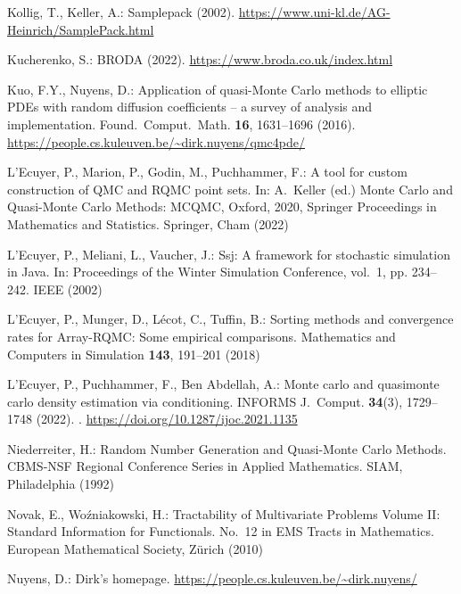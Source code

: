 \documentclass[graybox]{svmult}
\begin{document}
\begin{thebibliography}{10}
	Kollig, T., Keller, A.: Samplepack (2002).
	\newblock \urlprefix\url{https://www.uni-kl.de/AG-Heinrich/SamplePack.html}

	Kucherenko, S.: {BRODA} (2022).
	\newblock \urlprefix\url{https://www.broda.co.uk/index.html}

	Kuo, F.Y., Nuyens, D.: Application of quasi-{M}onte {C}arlo methods to elliptic
	{PDE}s with random diffusion coefficients -- a survey of analysis and
	implementation.
	\newblock Found.\ Comput.\ Math. \textbf{16}, 1631--1696 (2016).
	\newblock \urlprefix\url{https://people.cs.kuleuven.be/~dirk.nuyens/qmc4pde/}

	L'Ecuyer, P., Marion, P., Godin, M., Puchhammer, F.: A tool for custom
	construction of {QMC} and {RQMC} point sets.
	\newblock In: A.~Keller (ed.) {M}onte {C}arlo and Quasi-{M}onte {C}arlo
	Methods: {MCQMC}, {O}xford, 2020, Springer Proceedings in Mathematics and
	Statistics. Springer, Cham (2022)

	L'Ecuyer, P., Meliani, L., Vaucher, J.: Ssj: A framework for stochastic
	simulation in {Java}.
	\newblock In: Proceedings of the Winter Simulation Conference, vol.~1, pp.
	234--242. IEEE (2002)

	L'Ecuyer, P., Munger, D., L{\'e}cot, C., Tuffin, B.: Sorting methods and
	convergence rates for {Array-RQMC}: Some empirical comparisons.
	\newblock Mathematics and Computers in Simulation \textbf{143}, 191--201 (2018)

	L'Ecuyer, P., Puchhammer, F., {Ben Abdellah}, A.: Monte carlo and
	quasi{\textendash}monte carlo density estimation via conditioning.
	\newblock INFORMS J.\ Comput. \textbf{34}(3), 1729--1748 (2022).
	\newblock {}.
	\newblock \urlprefix\url{https://doi.org/10.1287/ijoc.2021.1135}

	Niederreiter, H.: Random Number Generation and Quasi-{M}onte {C}arlo Methods.
	\newblock CBMS-NSF Regional Conference Series in Applied Mathematics. SIAM,
	Philadelphia (1992)

	Novak, E., Wo{\'{z}}niakowski, H.: Tractability of Multivariate Problems
	{V}olume {II}: {S}tandard Information for Functionals.
	\newblock No.~12 in EMS Tracts in Mathematics. European Mathematical Society,
	Z\"urich (2010)

	Nuyens, D.: Dirk's homepage.
	\newblock \urlprefix\url{https://people.cs.kuleuven.be/~dirk.nuyens/}


\end{thebibliography}
\end{document}
